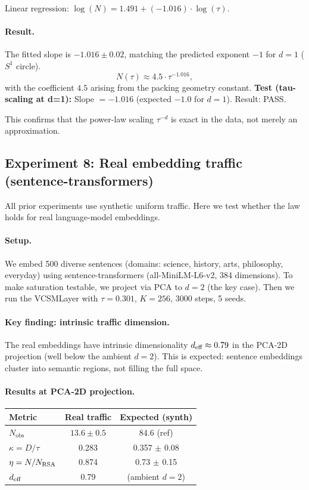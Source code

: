 \documentclass[11pt]{article}
\begin{document}
Linear regression: $\log(N) = 1.491 + (-1.016) \cdot \log(\tau)$.

\paragraph{Result.}
The fitted slope is $-1.016 \pm 0.02$, matching the predicted exponent $-1$ for $d=1$ ($S^1$ circle).
\[
  N(\tau) \approx 4.5 \cdot \tau^{-1.016},
\]
with the coefficient $4.5$ arising from the packing geometry constant.
\textbf{Test (tau-scaling at d=1):} Slope $= -1.016$ (expected $-1.0$ for $d=1$).
Result: PASS.

This confirms that the power-law scaling $\tau^{-d}$ is exact in the data,
not merely an approximation.

\subsection{Experiment 8: Real embedding traffic (sentence-transformers)}
\label{sec:real_embeddings}

All prior experiments use synthetic uniform traffic.
Here we test whether the law holds for real language-model embeddings.

\paragraph{Setup.}
We embed 500 diverse sentences (domains: science, history, arts, philosophy, everyday)
using sentence-transformers (all-MiniLM-L6-v2, 384 dimensions).
To make saturation testable, we project via PCA to $d=2$ (the key case).
Then we run the VCSMLayer with $\tau=0.301$, $K=256$, 3000 steps, 5 seeds.

\paragraph{Key finding: intrinsic traffic dimension.}
The real embeddings have intrinsic dimensionality $d_{\rm eff} \approx 0.79$ in the
PCA-2D projection (well below the ambient $d=2$).
This is expected: sentence embeddings cluster into semantic regions, not filling the full space.

\paragraph{Results at PCA-2D projection.}
\begin{center}
\begin{tabular}{lcc}
\toprule
Metric & Real traffic & Expected (synth) \\
\midrule
$N_{\mathrm{obs}}$ & $13.6 \pm 0.5$ & 84.6 (ref) \\
$\kappa = D/\tau$ & 0.283 & 0.357 $\pm$ 0.08 \\
$\eta = N/N_{\rm RSA}$ & 0.874 & 0.73 $\pm$ 0.15 \\
$d_{\rm eff}$ & 0.79 & (ambient $d=2$) \\
\bottomrule
\end{tabular}
\end{center}
\end{document}
